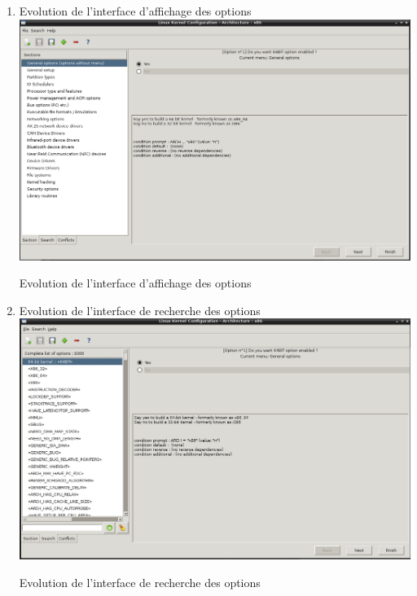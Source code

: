 \documentclass[16pts]{report}
\begin{document}
\begin{enumerate}
	\item Evolution de l'interface d'affichage des options
	\\
	\includegraphics[scale=0.5]{illustrations/screen_options_interface.png}
	\centering
	\caption{Evolution de l'interface d'affichage des options}
	\label{fig:Evo_config}



	\item Evolution de l'interface de recherche des options
	\\
	\includegraphics[scale=0.5]{illustrations/screen_options_search_interface.png}
	\centering
	\caption{Evolution de l'interface de recherche des options}
	\label{fig:Evo_config}




\end{enumerate}
\end{document}
